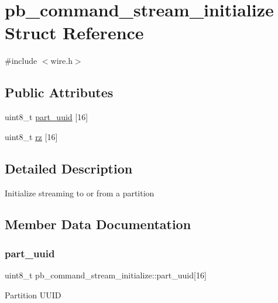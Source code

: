 \hypertarget{structpb__command__stream__initialize}{}\section{pb\+\_\+command\+\_\+stream\+\_\+initialize Struct Reference}
\label{structpb__command__stream__initialize}


{\ttfamily \#include $<$wire.\+h$>$}

\subsection*{Public Attributes}
\begin{DoxyCompactItemize}
\item 
uint8\+\_\+t \hyperlink{structpb__command__stream__initialize_acc1cf9e777fa1386bd9f2765667c9c76}{part\+\_\+uuid} \mbox{[}16\mbox{]}
\item 
uint8\+\_\+t \hyperlink{structpb__command__stream__initialize_a13e6043226d71fae7bc08081a4917074}{rz} \mbox{[}16\mbox{]}
\end{DoxyCompactItemize}


\subsection{Detailed Description}
Initialize streaming to or from a partition 

\subsection{Member Data Documentation}
\mbox{\label{structpb__command__stream__initialize_acc1cf9e777fa1386bd9f2765667c9c76}} 
\subsubsection{\texorpdfstring{part\+\_\+uuid}{part\_uuid}}
{\footnotesize\ttfamily uint8\+\_\+t pb\+\_\+command\+\_\+stream\+\_\+initialize\+::part\+\_\+uuid\mbox{[}16\mbox{]}}

Partition U\+U\+ID \mbox{\label{structpb__command__stream__initialize_a13e6043226d71fae7bc08081a4917074}} 
